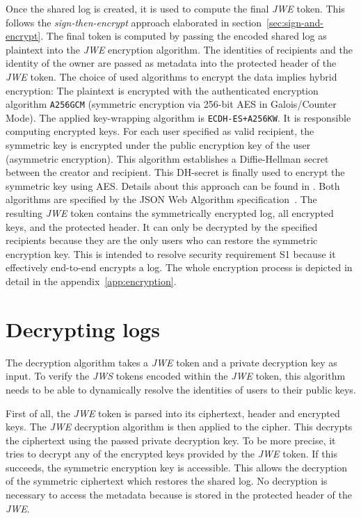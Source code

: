 \documentclass[../main.tex]{subfiles}
\begin{document}
Once the  shared log is created, it is used to compute the final \emph{JWE} token.
This follows the \emph{sign-then-encrypt} approach elaborated in section~\ref{sec:sign-and-encrypt}.
The final token is computed by passing the encoded shared log as plaintext into the \emph{JWE} encryption algorithm.
The identities of recipients and the identity of the owner are passed as metadata into the protected header of the \emph{JWE} token.
The choice of used algorithms to encrypt the data implies hybrid encryption:
The plaintext is encrypted with the authenticated encryption algorithm \verb|A256GCM| (symmetric encryption via 256-bit AES in Galois/Counter Mode).
The applied key-wrapping algorithm is \verb|ECDH-ES+A256KW|.
It is responsible computing encrypted keys.
For each user specified as valid recipient, the symmetric key is encrypted under the public encryption key of the user (asymmetric encryption).
This algorithm establishes a Diffie-Hellman secret between the creator and recipient.
This DH-secret is finally used to encrypt the symmetric key using AES.
Details about this approach can be found in \cite[100]{Barker2017}.
Both algorithms are specified by the JSON Web Algorithm specification~\cite{Jones2015}.
The resulting \emph{JWE} token contains the symmetrically encrypted log, all encrypted keys, and the protected header.
It can only be decrypted by the specified recipients because they are the only users who can restore the symmetric encryption key.
This is intended to resolve security requirement S1 because it effectively end-to-end encrypts a log.
The whole encryption process is depicted in detail in the appendix~\ref{app:encryption}.

\section{Decrypting logs}\label{sec:decrypting}

The decryption algorithm takes a \emph{JWE} token and a private decryption key as input.
To verify the \emph{JWS} tokens encoded within the \emph{JWE} token, this algorithm needs to be able to dynamically resolve the identities of users to their public keys.

First of all, the \emph{JWE} token is parsed into its ciphertext, header and encrypted keys.
The \emph{JWE} decryption algorithm is then applied to the cipher.
This decrypts the ciphertext using the passed private decryption key.
To be more precise, it tries to decrypt any of the encrypted keys provided by the \emph{JWE} token.
If this succeeds, the symmetric encryption key is accessible.
This allows the decryption of the symmetric ciphertext which restores the shared log.
No decryption is necessary to access the metadata because is stored in the protected header of the \emph{JWE}.
\end{document}
